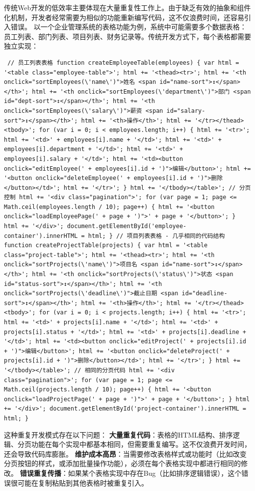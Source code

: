 传统Web开发的低效率主要体现在大量重复性工作上。由于缺乏有效的抽象和组件化机制，开发者经常需要为相似的功能重新编写代码，这不仅浪费时间，还容易引入错误。 以一个企业管理系统的表格功能为例，系统中可能需要多个数据表格：员工列表、部门列表、项目列表、财务记录等。传统开发方式下，每个表格都需要独立实现： \begin{verbatim} // 员工列表表格 function createEmployeeTable(employees) { var html = '<table class="employee-table">'; html += '<thead><tr>'; html += '<th onclick="sortEmployees(\'name\')">姓名 <span id="name-sort">↕</span></th>'; html += '<th onclick="sortEmployees(\'department\')">部门 <span id="dept-sort">↕</span></th>'; html += '<th onclick="sortEmployees(\'salary\')">薪资 <span id="salary-sort">↕</span></th>'; html += '<th>操作</th>'; html += '</tr></thead><tbody>'; for (var i = 0; i < employees.length; i++) { html += '<tr>'; html += '<td>' + employees[i].name + '</td>'; html += '<td>' + employees[i].department + '</td>'; html += '<td>' + employees[i].salary + '</td>'; html += '<td><button onclick="editEmployee(' + employees[i].id + ')">编辑</button>'; html += '<button onclick="deleteEmployee(' + employees[i].id + ')">删除</button></td>'; html += '</tr>'; } html += '</tbody></table>'; // 分页控制 html += '<div class="pagination">'; for (var page = 1; page <= Math.ceil(employees.length / 10); page++) { html += '<button onclick="loadEmployeePage(' + page + ')">' + page + '</button>'; } html += '</div>'; document.getElementById('employee-container').innerHTML = html; } // 项目列表表格 - 几乎相同的代码结构 function createProjectTable(projects) { var html = '<table class="project-table">'; html += '<thead><tr>'; html += '<th onclick="sortProjects(\'name\')">项目名 <span id="name-sort">↕</span></th>'; html += '<th onclick="sortProjects(\'status\')">状态 <span id="status-sort">↕</span></th>'; html += '<th onclick="sortProjects(\'deadline\')">截止日期 <span id="deadline-sort">↕</span></th>'; html += '<th>操作</th>'; html += '</tr></thead><tbody>'; for (var i = 0; i < projects.length; i++) { html += '<tr>'; html += '<td>' + projects[i].name + '</td>'; html += '<td>' + projects[i].status + '</td>'; html += '<td>' + projects[i].deadline + '</td>'; html += '<td><button onclick="editProject(' + projects[i].id + ')">编辑</button>'; html += '<button onclick="deleteProject(' + projects[i].id + ')">删除</button></td>'; html += '</tr>'; } html += '</tbody></table>'; // 相同的分页代码 html += '<div class="pagination">'; for (var page = 1; page <= Math.ceil(projects.length / 10); page++) { html += '<button onclick="loadProjectPage(' + page + ')">' + page + '</button>'; } html += '</div>'; document.getElementById('project-container').innerHTML = html; } \end{verbatim} 这种重复开发模式存在以下问题： \textbf{大量重复代码}：表格的HTML结构、排序逻辑、分页功能在每个实现中都基本相同，但需要重复编写。这不仅浪费开发时间，还会导致代码库膨胀。 \textbf{维护成本高昂}：当需要修改表格样式或功能时（比如改变分页按钮的样式，或添加批量操作功能），必须在每个表格实现中都进行相同的修改。 \textbf{错误重复传播}：如果某个表格实现中存在Bug（比如排序逻辑错误），这个错误很可能在复制粘贴到其他表格时被重复引入。 